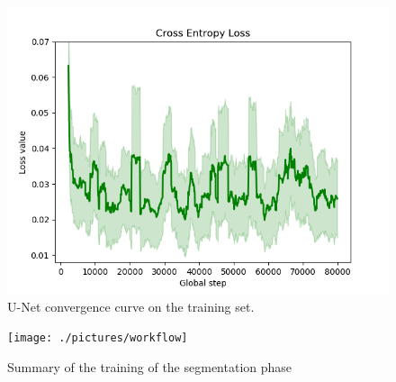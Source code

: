 \begin{figure}[t!]
    \centering
    \captionsetup{justification=centering}
    \includegraphics[width=\textwidth]{./pictures/cross-entropy-loss}
    \caption{U-Net convergence curve on the training set.}
    \label{fig:cross-entropy-loss}
\end{figure}
\clearpage
\begin{figure}[h]
    \centering
    \captionsetup{justification=centering}
    \texttt{[image: ./pictures/workflow]}
    \caption{Summary of the training of the segmentation phase}
    \label{fig:workflow}
\end{figure}
\clearpage
